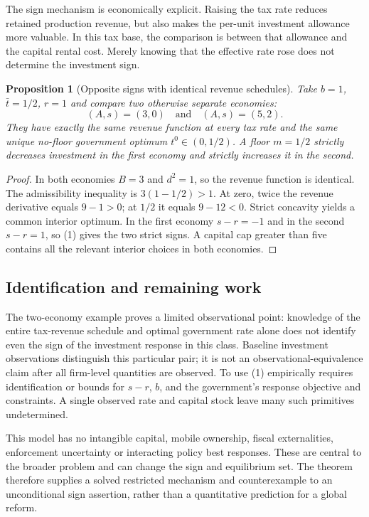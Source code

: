 \documentclass[11pt,a4paper]{article}
\newtheorem{proposition}[theorem]{Proposition}
\begin{document}
The sign mechanism is economically explicit. Raising the tax rate reduces retained production revenue, but also makes the per-unit investment allowance more valuable. In this tax base, the comparison is between that allowance and the capital rental cost. Merely knowing that the effective rate rose does not determine the investment sign.

\begin{proposition}[Opposite signs with identical revenue schedules]
Take $b=1$, $\bar t=1/2$, $r=1$ and compare two otherwise separate economies:
\[
 (A,s)=(3,0)\quad\text{and}\quad(A,s)=(5,2).
\]
They have exactly the same revenue function at every tax rate and the same unique no-floor government optimum $t^0\in(0,1/2)$. A floor $m=1/2$ strictly decreases investment in the first economy and strictly increases it in the second.
\end{proposition}
\begin{proof}
In both economies $B=3$ and $d^2=1$, so the revenue function is identical. The admissibility inequality is $3(1-1/2)>1$. At zero, twice the revenue derivative equals $9-1>0$; at $1/2$ it equals $9-12<0$. Strict concavity yields a common interior optimum. In the first economy $s-r=-1$ and in the second $s-r=1$, so (1) gives the two strict signs. A capital cap greater than five contains all the relevant interior choices in both economies.
\end{proof}

\subsection*{Identification and remaining work}
The two-economy example proves a limited observational point: knowledge of the entire tax-revenue schedule and optimal government rate alone does not identify even the sign of the investment response in this class. Baseline investment observations distinguish this particular pair; it is not an observational-equivalence claim after all firm-level quantities are observed. To use (1) empirically requires identification or bounds for $s-r$, $b$, and the government's response objective and constraints. A single observed rate and capital stock leave many such primitives undetermined.

This model has no intangible capital, mobile ownership, fiscal externalities, enforcement uncertainty or interacting policy best responses. These are central to the broader problem and can change the sign and equilibrium set. The theorem therefore supplies a solved restricted mechanism and counterexample to an unconditional sign assertion, rather than a quantitative prediction for a global reform.
\end{document}
